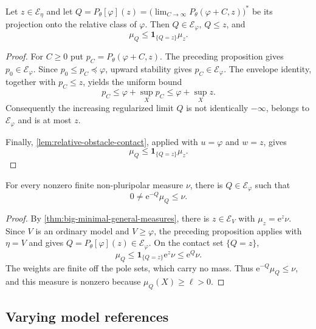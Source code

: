 \begin{proposition}\label{prop:big-relative-projection}
Let $z\in\mathcal E_\eta$ and let $Q=P_\theta[\varphi](z)=\bigl(\lim_{C\to\infty}P_\theta(\varphi+C,z)\bigr)^*$ be its projection onto the relative class of $\varphi$.
Then $Q\in\mathcal E_\varphi$, $Q\leq z$, and
\[
 \mu_Q\leq\mathbf1_{\{Q=z\}}\mu_z.
\]
\end{proposition}
\begin{proof}
For $C\geq0$ put $p_C=P_\theta(\varphi+C,z)$. The preceding proposition gives $p_0\in\mathcal E_\varphi$. Since $p_0\leq p_C\preceq\varphi$, upward stability gives $p_C\in\mathcal E_\varphi$. The envelope identity, together with $p_C\leq z$, yields the uniform bound
\[
 p_C\leq\varphi+\sup_Xp_C\leq\varphi+\sup_Xz.
\]
Consequently the increasing regularized limit $Q$ is not identically $-\infty$, belongs to $\mathcal E_\varphi$ and is at most $z$.

Finally, \cref{lem:relative-obstacle-contact}, applied with $u=\varphi$ and $w=z$, gives
\begin{equation}\label{eq:big-projection-contact-tail}
 \mu_Q\leq\mathbf1_{\{Q=z\}}\mu_z.
\end{equation}
\end{proof}

\begin{corollary}\label{cor:big-relative-supersolution}
For every nonzero finite non-pluripolar measure $\nu$, there is $Q\in\mathcal E_\varphi$ such that
\[
 0\ne \mathrm{e}^{-Q}\mu_Q\leq\nu.
\]
\end{corollary}
\begin{proof}
By \cref{thm:big-minimal-general-measures}, there is $z\in\mathcal E_V$ with $\mu_z=\mathrm{e}^z\nu$. Since $V$ is an ordinary model and $V\geq\varphi$, the preceding proposition applies with $\eta=V$ and gives $Q=P_\theta[\varphi](z)\in\mathcal E_\varphi$. On the contact set $\{Q=z\}$,
\[
 \mu_Q\leq\mathbf1_{\{Q=z\}}\mathrm{e}^z\nu\leq \mathrm{e}^Q\nu.
\]
The weights are finite off the pole sets, which carry no mass. Thus $\mathrm{e}^{-Q}\mu_Q\leq\nu$, and this measure is nonzero because $\mu_Q(X)\geq\ell>0$.
\end{proof}

\subsection{Varying model references}
\label{subsec:big-varying-models}

